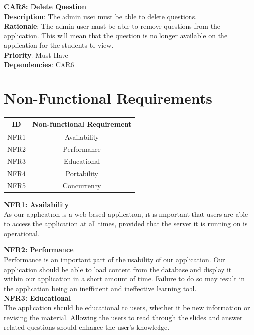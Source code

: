 \documentclass{l3proj}
\begin{document}
\textbf{CAR8: Delete Question}\\
\textbf{Description}: The admin user must be able to delete questions. \\
\textbf{Rationale}:  The admin user must be able to remove questions from the application. This will mean that the question is no longer available on the application for the students to view.\\
\textbf{Priority}: Must Have\\
\textbf{Dependencies}: CAR6\\

\section{Non-Functional Requirements}

\begin{center}
\begin{tabular}{|c|c|}
\hline \textbf{ID} & \textbf{Non-functional Requirement}\\
\hline NFR1 & Availability\\
\hline NFR2 & Performance\\
\hline NFR3 & Educational\\
\hline NFR4 & Portability\\
\hline NFR5 & Concurrency\\
\hline
\end{tabular}
\end{center}

\textbf{ NFR1: Availability}\\
As our application is a web-based application, it is important that users are able to access the application at all times, provided that the server it is running on is operational.

\textbf{NFR2: Performance}\\
Performance is an important part of the usability of our application. Our application should be able to load content from the database and display it within our application in a short amount of time. Failure to do so may result in the application being an inefficient and ineffective learning tool.\\

\textbf{ NFR3: Educational}\\
The application should be educational to users, whether it be new information or revising the material. Allowing the users to read through the slides and answer related questions should enhance the user's knowledge.
\end{document}
